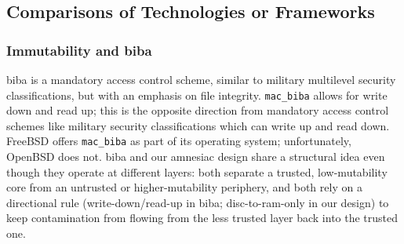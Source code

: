 \subsection{Comparisons of Technologies or Frameworks}
\subsubsection{Immutability and \gls{biba}}
 \Gls{biba} is a mandatory access control scheme, similar to military multilevel security classifications, but with an emphasis on file \gls{integrity}. \texttt{mac\_biba} allows for write down and read up; this is the opposite direction from mandatory access control schemes like military security classifications which can write up and read down.  FreeBSD offers \texttt{mac\_biba} as part of its \gls{operating system}; unfortunately, OpenBSD does not.    \Gls{biba} and our \gls{amnesiac} design share a structural idea even though they operate at different layers: both separate a trusted, low-mutability core from an untrusted or higher-mutability periphery, and both rely on a directional rule (write-down/read-up in \gls{biba}; disc-to-\gls{ram}-only in our design) to keep contamination from flowing from the less trusted layer back into the trusted one.

